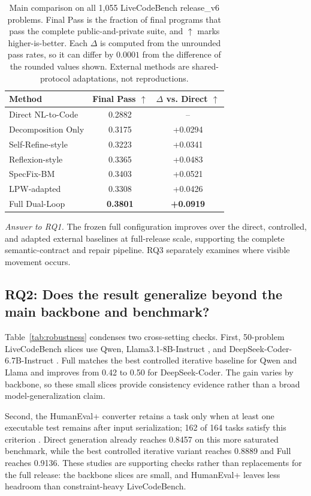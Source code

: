 \documentclass{article}
\newcommand{\up}{\ensuremath{\uparrow}}
\begin{document}
\begin{table}[t]
\centering
\small
\begin{tabular}{@{}lcc@{}}
\toprule
Method & Final Pass \up & $\Delta$ vs. Direct \up \\
\midrule
Direct NL-to-Code & 0.2882 & -- \\
Decomposition Only & 0.3175 & +0.0294 \\
Self-Refine-style & 0.3223 & +0.0341 \\
Reflexion-style & 0.3365 & +0.0483 \\
SpecFix-BM \citep{ref_specfix} & 0.3403 & +0.0521 \\
LPW-adapted \citep{ref_planning_driven_programming} & 0.3308 & +0.0426 \\
Full Dual-Loop & \textbf{0.3801} & \textbf{+0.0919} \\
\bottomrule
\end{tabular}
\caption{Main comparison on all 1,055 LiveCodeBench release\_v6 problems. Final Pass is the fraction of final programs that pass the complete public-and-private suite, and \up{} marks higher-is-better. Each $\Delta$ is computed from the unrounded pass rates, so it can differ by $0.0001$ from the difference of the rounded values shown. External methods are shared-protocol adaptations, not reproductions.}
\label{tab:main}
\end{table}

\noindent\textit{Answer to RQ1.}
The frozen full configuration improves over the direct, controlled, and adapted external baselines at full-release scale, supporting the complete semantic-contract and repair pipeline. RQ3 separately examines where visible movement occurs.

\subsection{RQ2: Does the result generalize beyond the main backbone and benchmark?}

Table~\ref{tab:robustness} condenses two cross-setting checks. First, 50-problem LiveCodeBench slices use Qwen, Llama3.1-8B-Instruct \citep{ref_llama3}, and DeepSeek-Coder-6.7B-Instruct \citep{ref_deepseek_coder}. Full matches the best controlled iterative baseline for Qwen and Llama and improves from 0.42 to 0.50 for DeepSeek-Coder. The gain varies by backbone, so these small slices provide consistency evidence rather than a broad model-generalization claim.

Second, the HumanEval+ converter retains a task only when at least one executable test remains after input serialization; 162 of 164 tasks satisfy this criterion \citep{ref_evalplus}. Direct generation already reaches 0.8457 on this more saturated benchmark, while the best controlled iterative variant reaches 0.8889 and Full reaches 0.9136. These studies are supporting checks rather than replacements for the full release: the backbone slices are small, and HumanEval+ leaves less headroom than constraint-heavy LiveCodeBench.
\end{document}
